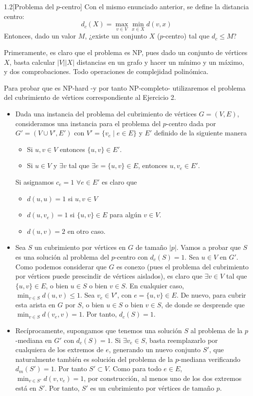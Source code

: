 \documentclass[twoside]{article}
\begin{document}
\newpage
\begin{ejercicio}{1.2}[Problema del $p$-centro]
Con el mismo enunciado anterior, se define la distancia centro:
$$
d_c(X) = \max_{v\in V}\min_{x\in X} d(v,x)
$$
Entonces, dado un valor $M$, ¿existe un conjunto $X$ ($p$-centro) tal que $d_c \leq M$?
\end{ejercicio}

\begin{solucion}
Primeramente, es claro que el problema es NP, pues dado un conjunto de vértices $X$, basta calcular $|V||X|$ distancias en un grafo y hacer un mínimo y un máximo, y dos comprobaciones. Todo operaciones de complejidad polinómica.	

Para probar que es NP-hard -y por tanto NP-completo- utilizaremos el problema del cubrimiento de vértices correspondiente al Ejercicio 2. 
\begin{itemize}
\item Dada una instancia del problema del cubrimiento de vértices $G=(V,E)$, consideramos una instancia para el problema del $p$-centro dada por $G'=(V\cup V',E')$ con $V' = \{v_e \mid e \in E\}$ y $E'$ definido de la siguiente manera
\begin{itemize}
\item Si $u,v \in V$ entonces $\{u,v\}\in E'$.
\item Si $u\in V$ y $\exists v$ tal que $\exists e=\{u,v\}\in E$, entonces ${u,v_e} \in E'$. 
\end{itemize}
Si asignamos $c_e=1$ $\forall e \in E'$ es claro que 
\begin{itemize}
\item $d(u,u) = 1$ si $u,v \in V$
\item $d(u,v_e)=1$ si $\{u,v\} \in E$ para algún $v\in V$.
\item $d(u,v)=2$ en otro caso.
\end{itemize}
\item Sea $S$ un cubrimiento por vértices en $G$ de tamaño $|p|$. Vamos a probar que $S$ es una solución al problema del $p$-centro con $d_c(S)=1$. Sea $u \in V$ en $G'$. Como podemos considerar que $G$ es conexo (pues el problema del cubrimiento por vértices puede prescindir de vértices aislados), es claro que $\exists v \in V$ tal que $\{u,v\} \in E$, o bien $u \in S$ o bien $v\in S$. En cualquier caso, $\min_{v \in S}d(u,v) \leq 1$. Sea $v_e \in V'$, con $e=\{u,v\}\in E$. De nuevo, para cubrir esta arista en $G$ por $S$, o bien $u\in S$ o bien $v\in S$, de donde se desprende que $\min_{v\in S}d(v_e,v) = 1$. Por tanto, $d_c(S)=1$.
\item Recíprocamente, supongamos que tenemos una solución $S$ al problema de la $p$-mediana en $G'$ con $d_c(S) = 1$. Si $\exists v_e \in S$, basta reemplazarlo por cualquiera de los extremos de $e$, generando un nuevo conjunto $S'$, que naturalmente también es solución del problema de la $p$-mediana verificando $d_m(S')=1$. Por tanto $S'\subset V$. Como para todo $e\in E$, $\min_{v\in S'} d(v,v_e) = 1$, por construcción, al menos uno de los dos extremos está en $S'$. Por tanto, $S'$ es un cubrimiento por vértices de tamaño $p$.
\end{itemize}
\end{solucion}
\newpage
\end{document}
